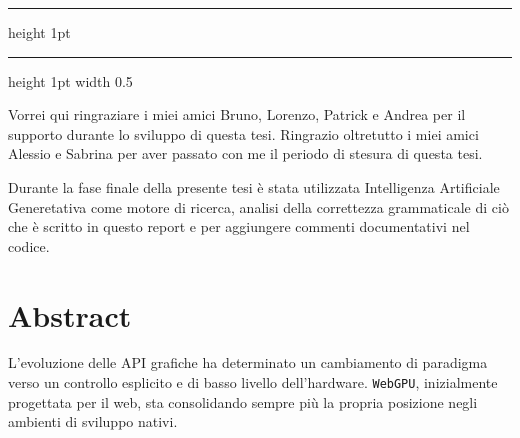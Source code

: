 \documentclass[a4paper, 11pt, twoside]{report}
\newif\ifshowlogo
\newcommand{\blankpage}{
    \clearpage
    \thispagestyle{empty}     %
    \showlogofalse            %
    \hbox{}                   %
    \newpage
    \showlogotrue             %
}
\newenvironment{dedication}
{%
  \thispagestyle{empty}
  \vspace*{\stretch{2}}
  \itshape
  \raggedright
}
{\par
 \vspace{\stretch{3}}
 \clearpage
}
\newenvironment{disclaimer}
{%
  \thispagestyle{empty}
  \vspace*{\stretch{2}}
  \itshape
  \raggedleft
}
{\par
 \vspace{\stretch{3}}
 \clearpage
}
\begin{document}
\begin{titlepage}
\vspace{35pt}
\hrule height 1pt %
\vspace{8pt}

\noindent
{}
\vspace{5cm}                          %
\hrule height 1pt width 0.5\textwidth %
\vspace{8pt}
\noindent
\begin{minipage}[t]{\textwidth}
    \vspace{0pt}
\end{minipage}
\end{titlepage}
\restoregeometry

\blankpage

\showlogofalse
\begin{dedication}
    Vorrei qui ringraziare i miei amici
    \textnormal{Bruno, Lorenzo, Patrick e \small{Andrea}}\newline
    per il supporto durante lo sviluppo di questa tesi.\newline
    Ringrazio oltretutto i miei amici
    \textnormal{Alessio e Sabrina}\newline
    per aver passato con me il periodo di stesura di questa tesi.
\end{dedication}

\blankpage

\tableofcontents
\blankpage
\blankpage

\listoffigures
\blankpage
\listoftables
\blankpage
\renewcommand\listoflistingscaption{Elenco dei codici sorgente}
\listoflistings
\newpage

\showlogofalse
\begin{disclaimer}
    Durante la fase finale della presente tesi è stata utilizzata Intelligenza Artificiale Generetativa come motore di
    ricerca, analisi della correttezza grammaticale di ciò che è scritto in questo report e per aggiungere commenti
    documentativi nel codice.
\end{disclaimer}


\chapter{Abstract}

L’evoluzione delle API grafiche ha determinato un cambiamento di paradigma verso un controllo esplicito e di basso
livello dell’hardware.
\texttt{WebGPU}, inizialmente progettata per il web, sta consolidando sempre più la propria posizione negli ambienti di
sviluppo nativi.
\end{document}
